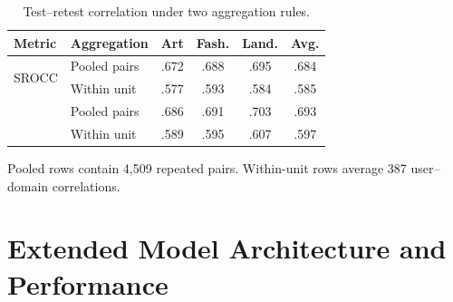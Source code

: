 \documentclass[10pt,twocolumn,letterpaper]{article}
\begin{document}
\begin{table}[!htbp]
\centering
\begin{threeparttable}
\caption{Test--retest correlation under two aggregation rules.}
\label{tab:retest_units}
\begin{tabular}{llcccc}
\toprule
Metric & Aggregation & Art & Fash. & Land. & Avg. \\
\midrule
\multirow{2}{*}{SROCC}
 & Pooled pairs & .672 & .688 & .695 & .684 \\
 & Within unit  & .577 & .593 & .584 & .585 \\
\addlinespace
\multirow{2}{*}{PLCC}
 & Pooled pairs & .686 & .691 & .703 & .693 \\
 & Within unit  & .589 & .595 & .607 & .597 \\
\bottomrule
\end{tabular}
\begin{tablenotes}[flushleft]\footnotesize
\item Pooled rows contain 4,509 repeated pairs. Within-unit rows average 387
user--domain correlations.
\end{tablenotes}
\end{threeparttable}
\end{table}

\FloatBarrier
\section{Extended Model Architecture and Performance}
\label{sec:supp_arch_perf}
\end{document}
